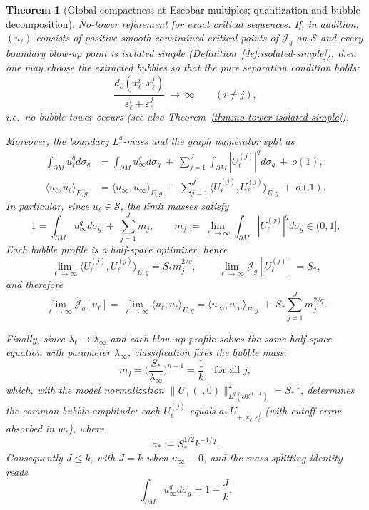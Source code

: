 \documentclass[11pt,reqno,a4paper]{amsart}
\newcommand{\R}{\mathbb{R}}
\numberwithin{equation}{section}
\theoremstyle{plain}
\newtheorem{theorem}{Theorem}[section]
\theoremstyle{remark}
\theoremstyle{plain}
\begin{document}
\begin{theorem}[Global compactness at Escobar multiples; quantization and bubble decomposition]
\noindent\emph{No-tower refinement for exact critical sequences.}
If, in addition, $(u_\ell)$ consists of positive smooth constrained critical points of
$\mathcal J_g$ on $\mathcal S$ and every boundary blow-up point is isolated simple
(Definition~\ref{def:isolated-simple}),
then one may choose the extracted bubbles so that the pure separation condition holds:
\[
\frac{d_\partial(x_\ell^i,x_\ell^j)}{\varepsilon_\ell^i+\varepsilon_\ell^j}\ \longrightarrow\ \infty
\qquad(i\neq j),
\]
i.e.\ no bubble tower occurs (see also Theorem~\ref{thm:no-tower-isolated-simple}).

Moreover, the boundary $L^q$-mass and the graph numerator split as
\begin{align}
\int_{\partial M}u_\ell^qd\sigma_g
&=\int_{\partial M}u_\infty^qd\sigma_g\ +\ \sum_{j=1}^{J}\int_{\partial M}|U^{(j)}_\ell|^qd\sigma_g\ +\ o(1),
\label{eq:mass-splitting}\\
\langle u_\ell,u_\ell\rangle_{E,g}
&=\langle u_\infty,u_\infty\rangle_{E,g}\ +\ \sum_{j=1}^{J}\langle U^{(j)}_\ell,U^{(j)}_\ell\rangle_{E,g}\ +\ o(1).
\label{eq:energy-splitting}
\end{align}
In particular, since $u_\ell\in\mathcal S$, the limit masses satisfy
\[
1=\int_{\partial M}u_\infty^qd\sigma_g\ +\ \sum_{j=1}^{J} m_j,
\qquad
m_j:=\lim_{\ell\to\infty}\int_{\partial M}|U^{(j)}_\ell|^qd\sigma_g\in(0,1].
\]
Each bubble profile is a half-space optimizer, hence
\[
\lim_{\ell\to\infty}\langle U^{(j)}_\ell,U^{(j)}_\ell\rangle_{E,g}
= S_\ast m_j^{2/q},
\qquad
\lim_{\ell\to\infty}\mathcal J_g[U^{(j)}_\ell]=S_\ast,
\]
and therefore
\[
\lim_{\ell\to\infty}\mathcal J_g[u_\ell]
=\lim_{\ell\to\infty}\langle u_\ell,u_\ell\rangle_{E,g}
=\langle u_\infty,u_\infty\rangle_{E,g}\ +\ S_\ast\sum_{j=1}^{J} m_j^{2/q}.
\]

Finally, since $\lambda_\ell\to\lambda_\infty$ and each blow-up profile solves the same half-space equation with
parameter $\lambda_\infty$, classification fixes the bubble mass:
\[
m_j=\Big(\frac{S_\ast}{\lambda_\infty}\Big)^{n-1}=\frac1k\quad\text{for all }j,
\]
which, with the model normalization $\|U_+(\cdot,0)\|_{L^q(\partial\R^{n-1})}^2=S_\ast^{-1}$, determines the common bubble amplitude:
each $U^{(j)}_\ell$ equals $a_\ast\,U_{+,x_\ell^j,\varepsilon_\ell^j}$ (with cutoff error absorbed in $w_\ell$), where
\[
a_\ast:=S_\ast^{1/2}k^{-1/q}.
\]
Consequently $J\le k$, with $J=k$ when $u_\infty\equiv0$, and the mass-splitting identity reads
\[
\int_{\partial M}u_\infty^qd\sigma_g=1-\frac{J}{k}.
\]
\end{theorem}
\end{document}
